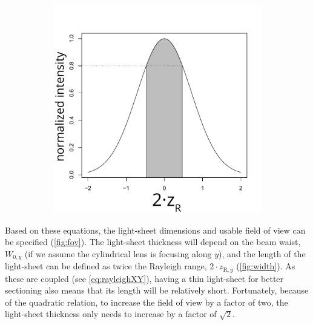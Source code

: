 \begin{figure}
\begin{subfigure}[b]{0.29\textwidth}
          \caption{}
          \label{fig:width}
      \end{subfigure}
      \begin{subfigure}[b]{0.29\textwidth}
          \centering
          \includegraphics[width=\textwidth]{height}
          \caption{}
          \label{fig:height}
      \end{subfigure}
      \label{fig:ls_dim}
    \end{figure}

    Based on these equations, the light-sheet dimensions and usable field of view can be specified (\autoref{fig:fov}). The light-sheet thickness will depend on the beam waist, $W_{0,y}$ (if we assume the cylindrical lens is focusing along $y$), and the length of the light-sheet can be defined as twice the Rayleigh range, $2 \cdot z_{\mathrm{R},y}$ (\autoref{fig:width}). As these are coupled (see \autoref{eq:rayleighXY}), having a thin light-sheet for better sectioning also means that its length will be relatively short. Fortunately, because of the quadratic relation, to increase the field of view by a factor of two, the light-sheet thickness only needs to increase by a factor of $\sqrt{2}$.

